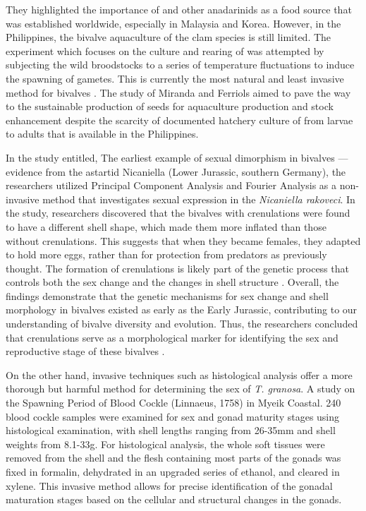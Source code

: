 They highlighted the importance of \Tgranosa and other anadarinids as a food source that was established worldwide, especially in Malaysia and Korea. However, in the Philippines, the bivalve aquaculture of the clam species is still limited. The experiment which focuses on the culture and rearing of \Tgranosa was attempted by subjecting the wild broodstocks to a series of temperature fluctuations to induce the spawning of gametes. This is currently the most natural and least invasive method for bivalves \cite{aji}. The study of Miranda and Ferriols aimed to pave the way to the sustainable production of \Tgranosa seeds for aquaculture production and stock enhancement despite the scarcity of documented hatchery culture of \Tgranosa from larvae to adults that is available in the Philippines.

In the study entitled, The earliest example of sexual dimorphism in bivalves — evidence from the astartid Nicaniella (Lower Jurassic, southern Germany), the researchers utilized Principal Component Analysis and Fourier Analysis as a non-invasive method that investigates sexual expression in the \textit{Nicaniella rakoveci}. In the study, researchers discovered that the bivalves with crenulations were found to have a different shell shape, which made them more inflated than those without crenulations. This suggests that when they became females, they adapted to hold more eggs, rather than for protection from predators as previously thought. The formation of crenulations is likely part of the genetic process that controls both the sex change and the changes in shell structure \cite{karapunar2021}. Overall, the findings demonstrate that the genetic mechanisms for sex change and shell morphology in bivalves existed as early as the Early Jurassic, contributing to our understanding of bivalve diversity and evolution. Thus, the researchers concluded that crenulations serve as a morphological marker for identifying the sex and reproductive stage of these bivalves  \cite{karapunar2021}.

On the other hand, invasive techniques such as histological analysis offer a more thorough but harmful method for determining the sex of \textit{T. granosa}. A study on the Spawning Period of Blood Cockle \Tegillarcagranosa (Linnaeus, 1758) in Myeik Coastal. 240 blood cockle samples were examined for sex and gonad maturity stages using histological examination, with shell lengths ranging from 26-35mm and shell weights from 8.1-33g. For histological analysis, the whole soft tissues were removed from the shell and the flesh containing most parts of the gonads was fixed in formalin, dehydrated in an upgraded series of ethanol, and cleared in xylene. This invasive method allows for precise identification of the gonadal maturation stages based on the cellular and structural changes in the gonads.


